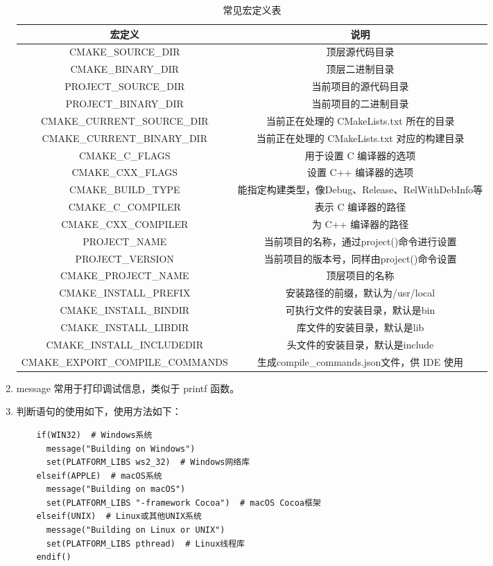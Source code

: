 \documentclass{article}
\begin{document}
\begin{enumerate}[leftmargin=1cm]
\begin{table}[!h]
  \caption{常见宏定义表}
  \label{hong}
  \centering 
  \begin{tabular}{|c|c|}
    \hline
    \textbf{宏定义} & \textbf{说明} \\ \hline
    CMAKE\_SOURCE\_DIR & 顶层源代码目录 \\ \hline
    CMAKE\_BINARY\_DIR & 顶层二进制目录 \\ \hline
    PROJECT\_SOURCE\_DIR & 当前项目的源代码目录 \\ \hline
    PROJECT\_BINARY\_DIR & 当前项目的二进制目录 \\ \hline
    CMAKE\_CURRENT\_SOURCE\_DIR & 当前正在处理的 CMakeLists.txt 所在的目录 \\ \hline 
    CMAKE\_CURRENT\_BINARY\_DIR & 当前正在处理的 CMakeLists.txt 对应的构建目录 \\ \hline 
    CMAKE\_C\_FLAGS & 用于设置 C 编译器的选项 \\ \hline 
    CMAKE\_CXX\_FLAGS & 设置 C++ 编译器的选项 \\ \hline 
    CMAKE\_BUILD\_TYPE & 能指定构建类型，像Debug、Release、RelWithDebInfo等 \\ \hline
    CMAKE\_C\_COMPILER & 表示 C 编译器的路径 \\ \hline 
    CMAKE\_CXX\_COMPILER & 为 C++ 编译器的路径 \\ \hline 
    PROJECT\_NAME & 当前项目的名称，通过project()命令进行设置 \\ \hline 
    PROJECT\_VERSION & 当前项目的版本号，同样由project()命令设置 \\ \hline 
    CMAKE\_PROJECT\_NAME & 顶层项目的名称 \\ \hline 
    CMAKE\_INSTALL\_PREFIX & 安装路径的前缀，默认为/usr/local \\ \hline
    CMAKE\_INSTALL\_BINDIR & 可执行文件的安装目录，默认是bin \\ \hline
    CMAKE\_INSTALL\_LIBDIR & 库文件的安装目录，默认是lib \\ \hline
    CMAKE\_INSTALL\_INCLUDEDIR & 头文件的安装目录，默认是include \\ \hline
    CMAKE\_EXPORT\_COMPILE\_COMMANDS & 生成compile\_commands.json文件，供 IDE 使用 \\ \hline
    
  \end{tabular}
\end{table}

  \item message 常用于打印调试信息，类似于 printf 函数。
  \item 判断语句的使用如下，使用方法如下：
  \begin{verbatim}
    if(WIN32)  # Windows系统
      message("Building on Windows")
      set(PLATFORM_LIBS ws2_32)  # Windows网络库
    elseif(APPLE)  # macOS系统
      message("Building on macOS")
      set(PLATFORM_LIBS "-framework Cocoa")  # macOS Cocoa框架
    elseif(UNIX)  # Linux或其他UNIX系统
      message("Building on Linux or UNIX")
      set(PLATFORM_LIBS pthread)  # Linux线程库
    endif()


\end{verbatim}
\end{enumerate}
\end{document}

